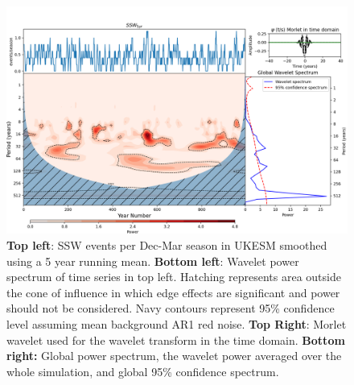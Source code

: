 \begin{figure}[h!]
\begin{center}
\noindent\includegraphics[width = 0.8\linewidth]{Figures/Figures-origins/SSW_wavelet_5_yr_wavelet.png}
\caption[Wavelet power spectrum for Dec-Mar 5 year mean SSW time series in UKESM pi-control]{\textbf{Top left}: SSW events per Dec-Mar season in UKESM smoothed using a 5 year running mean. \textbf{Bottom left}: Wavelet power spectrum of time series in top left. Hatching represents area outside the cone of influence in which edge effects are significant and power should not be considered. Navy contours represent 95\% confidence level assuming mean background AR1 red noise. \textbf{Top Right}: Morlet wavelet used for the wavelet transform in the time domain. \textbf{Bottom right:} Global power spectrum, the wavelet power averaged over the whole simulation, and global 95\% confidence spectrum.}
\label{fig:SSW_series_5yr_wavelet}
\end{center}
\end{figure}

